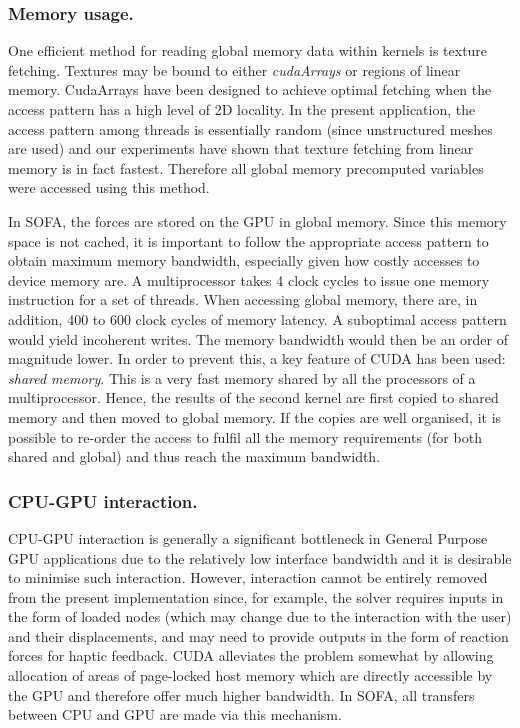 \subsubsection*{Memory usage.}
One efficient method for reading global memory data within kernels is texture fetching. Textures may be bound to either \emph{cudaArrays} or regions of linear memory. CudaArrays have been designed to achieve optimal fetching when the access pattern has a high level of 2D locality. In the present application, the access pattern among threads is essentially random (since unstructured meshes are used) and our experiments have shown that texture fetching from linear memory is in fact fastest. Therefore all global memory precomputed variables were accessed using this method.

In SOFA, the forces are stored on the GPU in global memory. Since this memory space is not cached, it is important to follow the appropriate access pattern to obtain maximum memory bandwidth, especially given how costly accesses to device memory are. A multiprocessor takes 4 clock cycles to issue one memory instruction for a set of threads. When accessing global memory, there are, in addition, 400 to 600 clock cycles of memory latency. A suboptimal access pattern would yield incoherent writes. The memory bandwidth would then be an order of magnitude lower. In order to prevent this, a key feature of CUDA has been used: \emph{shared memory}. This is a very fast memory shared by all the processors of a multiprocessor. Hence, the results of the second kernel are first copied to shared memory and then moved to global memory. If the copies are well organised, it is possible to re-order the access to fulfil all the memory requirements (for both shared and global) and thus reach the maximum bandwidth.

\subsubsection*{CPU-GPU interaction.}
CPU-GPU interaction is generally a significant bottleneck in General Purpose GPU applications due to the relatively low interface bandwidth and it is desirable to minimise such interaction. However, interaction cannot be entirely removed from the present implementation since, for example, the solver requires inputs in the form of loaded nodes (which may change due to the interaction with the user) and their displacements, and may need to provide outputs in the form of reaction forces for haptic feedback. CUDA alleviates the problem somewhat by allowing allocation of areas of page-locked host memory which are directly accessible by the GPU and therefore offer much higher bandwidth. In SOFA, all transfers between CPU and GPU are made via this mechanism.

